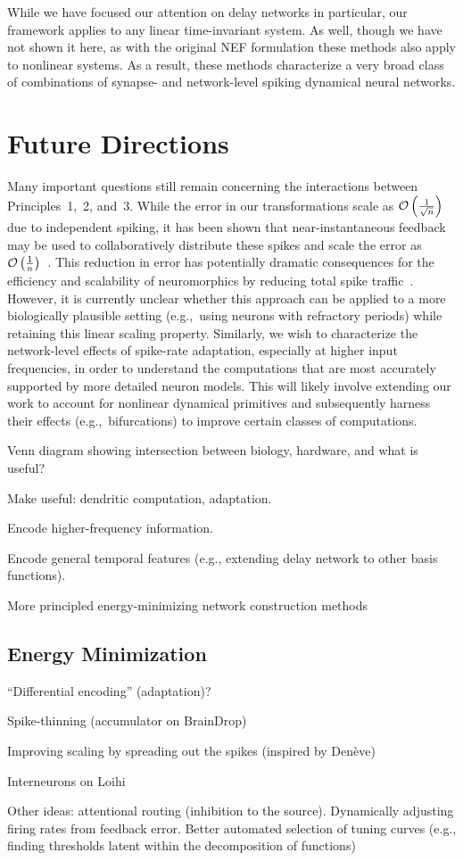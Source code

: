 While we have focused our attention on delay networks in particular, our framework applies to any linear time-invariant system.
As well, though we have not shown it here, as with the original NEF formulation these methods also apply to nonlinear systems.
As a result, these methods characterize a very broad class of combinations of synapse- and network-level spiking dynamical neural networks.

\section{Future Directions}

Many important questions still remain concerning the interactions between Principles~1,~2, and~3.
While the error in our transformations scale as $\mathcal{O}\left({ \frac{1}{\sqrt{n}} }\right)$ due to independent spiking, it has been shown that near-instantaneous feedback may be used to collaboratively distribute these spikes and scale the error as $\mathcal{O}\left({ \frac{1}{n} }\right)$~\citep{boerlin2013predictive, thalmeier2016learning}.
This reduction in error has potentially dramatic consequences for the efficiency and scalability of neuromorphics by reducing total spike traffic~\citep{boahen2017neuromorph}.
However, it is currently unclear whether this approach can be applied to a more biologically plausible setting (e.g.,~using neurons with refractory periods) while retaining this linear scaling property.
Similarly, we wish to characterize the network-level effects of spike-rate adaptation, especially at higher input frequencies, in order to understand the computations that are most accurately supported by more detailed neuron models.
This will likely involve extending our work to account for nonlinear dynamical primitives and subsequently harness their effects (e.g.,~bifurcations) to improve certain classes of computations.


Venn diagram showing intersection between biology, hardware, and what is useful?

Make useful: dendritic computation, adaptation.

Encode higher-frequency information.

Encode general temporal features (e.g., extending delay network to other basis functions).

More principled energy-minimizing network construction methods

\subsection{Energy Minimization}

``Differential encoding'' (adaptation)?

Spike-thinning (accumulator on BrainDrop)

Improving scaling by spreading out the spikes (inspired by Den\`eve)

Interneurons on Loihi

Other ideas: attentional routing (inhibition to the source). Dynamically adjusting firing rates from feedback error. Better automated selection of tuning curves (e.g., finding thresholds latent within the decomposition of functions)


